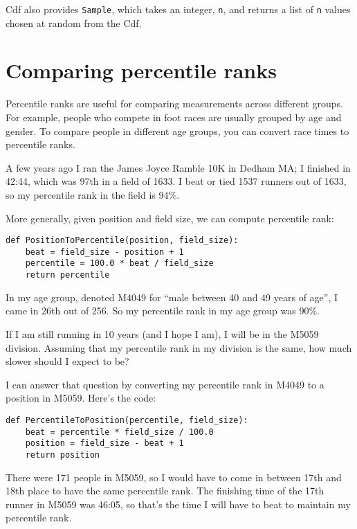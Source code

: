 Cdf also provides {\tt Sample}, which takes an integer,
{\tt n}, and returns a list of {\tt n} values chosen at random
from the Cdf.


\section{Comparing percentile ranks}

Percentile ranks are useful for comparing measurements across
different groups.  For example, people who compete in foot races are
usually grouped by age and gender.  To compare people in different
age groups, you can convert race times to percentile ranks.

A few years ago I ran the James Joyce Ramble 10K in
Dedham MA; I finished in 42:44, which was 97th in a field of 1633.  I beat or
tied 1537 runners out of 1633, so my percentile rank in the field is
94\%.   

More generally, given position and field size, we can compute
percentile rank:

\begin{verbatim}
def PositionToPercentile(position, field_size):
    beat = field_size - position + 1
    percentile = 100.0 * beat / field_size
    return percentile
\end{verbatim}

In my age group, denoted M4049 for ``male between 40 and 49 years of
age'', I came in 26th out of 256.  So my percentile rank in my age
group was 90\%.

If I am still running in 10 years (and I hope I am), I will be in
the M5059 division.  Assuming that my percentile rank in my division
is the same, how much slower should I expect to be?

I can answer that question by converting my percentile rank in M4049
to a position in M5059.  Here's the code:

\begin{verbatim}
def PercentileToPosition(percentile, field_size):
    beat = percentile * field_size / 100.0
    position = field_size - beat + 1
    return position
\end{verbatim}

There were 171 people in M5059, so I would have to come in between
17th and 18th place to have the same percentile rank.  The finishing
time of the 17th runner in M5059 was 46:05, so that's the time I will
have to beat to maintain my percentile rank.



